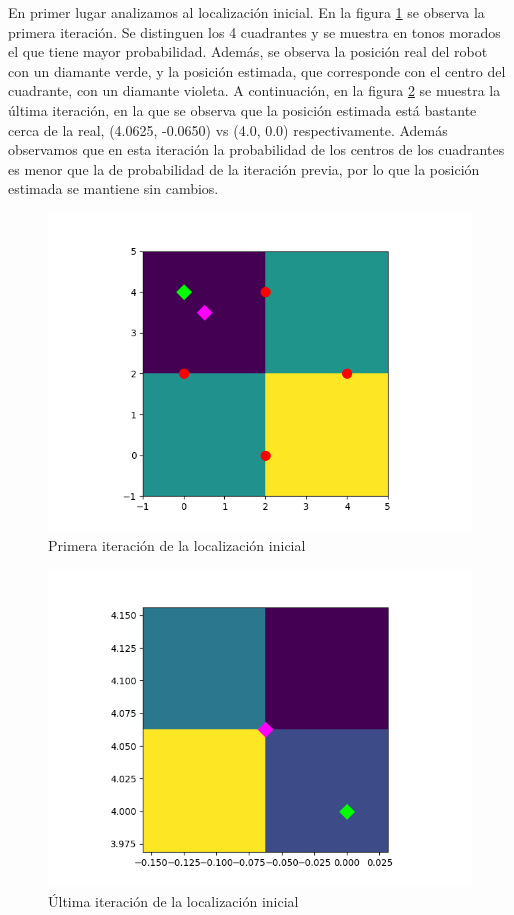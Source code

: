 \bigskip En primer lugar analizamos al localización inicial. En la figura \ref{fig:localizacion_ej1} se observa la primera iteración. Se distinguen los 4 cuadrantes y se muestra en tonos morados el que tiene mayor probabilidad.
Además, se observa la posición real del robot con un diamante verde, y la posición estimada, que corresponde con el centro del cuadrante, con un diamante violeta.
A continuación, en la figura \ref{fig:localizacion_ej2} se muestra la última iteración, en la que se observa que la posición estimada está bastante cerca de la real, (4.0625, -0.0650) vs (4.0, 0.0) respectivamente. Además observamos que en esta iteración la probabilidad de los centros de los cuadrantes es menor que la de probabilidad de la iteración previa, por lo que la posición estimada se mantiene sin cambios.
\begin{figure}[htb]
  \centering
  \includegraphics[width=1\linewidth]{images/localizacion7.png}
  \caption{Primera iteración de la localización inicial}
  \label{fig:localizacion_ej1}
\end{figure}
\begin{figure}[htb]
  \centering
  \includegraphics[width=1\linewidth]{images/localizacion8.png}
  \caption{Última iteración de la localización inicial}
  \label{fig:localizacion_ej2}
\end{figure}

